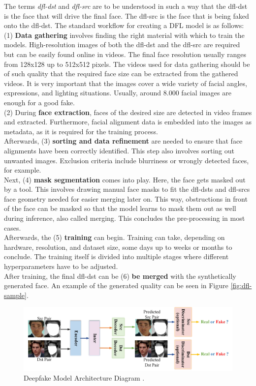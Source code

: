 \documentclass[
  a4paper,  %
  twoside,  %
  bibliography=totoc,
  headsepline,
  cleardoublepage=empty,
  parskip=half,
  draft=false
]{scrbook}
\begin{document}
The terms \textit{\gls{dfl-dst}} and \textit{\gls{dfl-src}} are to be understood in such a way that the \gls{dfl-dst} is the face that will drive the final face. The \gls{dfl-src} is the face that is being faked onto the \gls{dfl-dst}. The standard workflow for creating a DFL model is as follows:\\
(1) \textbf{Data gathering} involves finding the right material with which to train the models. High-resolution images of both the \gls{dfl-dst} and the \gls{dfl-src} are required but can be easily found online in videos. The final face resolution usually ranges from 128x128 up to 512x512 pixels. The videos used for data gathering should be of such quality that the required face size can be extracted from the gathered videos. It is very important that the images cover a wide variety of facial angles, expressions, and lighting situations. Usually, around 8.000 facial images are enough for a good fake. \\
(2) During \textbf{face extraction}, faces of the desired size are detected in video frames and extracted. Furthermore, facial alignment data is embedded into the images as metadata, as it is required for the training process. \\
Afterwards, (3) \textbf{sorting and data refinement} are needed to ensure that face alignments have been correctly identified. This step also involves sorting out unwanted images. Exclusion criteria include blurriness or wrongly detected faces, for example. \\
Next, (4) \textbf{mask segmentation} comes into play. Here, the face gets masked out by a tool. This involves drawing manual face masks to fit the \gls{dfl-dst}s and \gls{dfl-src}s face geometry needed for easier merging later on. This way, obstructions in front of the face can be masked so that the model learns to mask them out as well during inference, also called merging.  This concludes the pre-processing in most cases.\\
Afterwards, the (5) \textbf{training} can begin. Training can take, depending on hardware, resolution, and dataset size, some days up to weeks or months to conclude. The training itself is divided into multiple stages where different hyperparameters have to be adjusted. \\
After training, the final \gls{dfl-dst} can be (6) \textbf{be merged} with the synthetically generated face. An example of the generated quality can be seen in Figure \ref{fig:dfl-sample}.

\begin{figure}[h]
  \centering
  \includegraphics[width=1\textwidth]{./graphics/df-model-arch.png}
  \caption{Deepfake Model Architecture Diagram \cite{perovDeepFaceLabIntegratedFlexible2021}.}
  \label{fig:df-model-diagram}
\end{figure}
\end{document}

